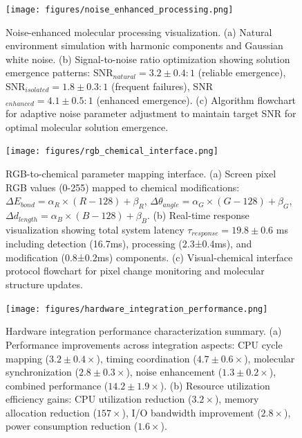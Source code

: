 \begin{figure}[H]
\centering
\texttt{[image: figures/noise\_enhanced\_processing.png]}
\caption{Noise-enhanced molecular processing visualization. (a) Natural environment simulation with harmonic components and Gaussian white noise. (b) Signal-to-noise ratio optimization showing solution emergence patterns: SNR$_{natural} = 3.2 \pm 0.4 : 1$ (reliable emergence), SNR$_{isolated} = 1.8 \pm 0.3 : 1$ (frequent failures), SNR$_{enhanced} = 4.1 \pm 0.5 : 1$ (enhanced emergence). (c) Algorithm flowchart for adaptive noise parameter adjustment to maintain target SNR for optimal molecular solution emergence.}
\label{fig:noise_enhancement}
\end{figure}

\begin{figure}[H]
\centering
\texttt{[image: figures/rgb\_chemical\_interface.png]}
\caption{RGB-to-chemical parameter mapping interface. (a) Screen pixel RGB values (0-255) mapped to chemical modifications: $\Delta E_{bond} = \alpha_R \times (R - 128) + \beta_R$, $\Delta \theta_{angle} = \alpha_G \times (G - 128) + \beta_G$, $\Delta d_{length} = \alpha_B \times (B - 128) + \beta_B$. (b) Real-time response visualization showing total system latency $\tau_{response} = 19.8 \pm 0.6$ ms including detection (16.7ms), processing (2.3±0.4ms), and modification (0.8±0.2ms) components. (c) Visual-chemical interface protocol flowchart for pixel change monitoring and molecular structure updates.}
\label{fig:rgb_interface}
\end{figure}

\begin{figure}[H]
\centering
\texttt{[image: figures/hardware\_integration\_performance.png]}
\caption{Hardware integration performance characterization summary. (a) Performance improvements across integration aspects: CPU cycle mapping ($3.2 \pm 0.4 \times$), timing coordination ($4.7 \pm 0.6 \times$), molecular synchronization ($2.8 \pm 0.3 \times$), noise enhancement ($1.3 \pm 0.2 \times$), combined performance ($14.2 \pm 1.9 \times$). (b) Resource utilization efficiency gains: CPU utilization reduction ($3.2 \times$), memory allocation reduction ($157 \times$), I/O bandwidth improvement ($2.8 \times$), power consumption reduction ($1.6 \times$).}
\label{fig:hardware_performance}
\end{figure}


